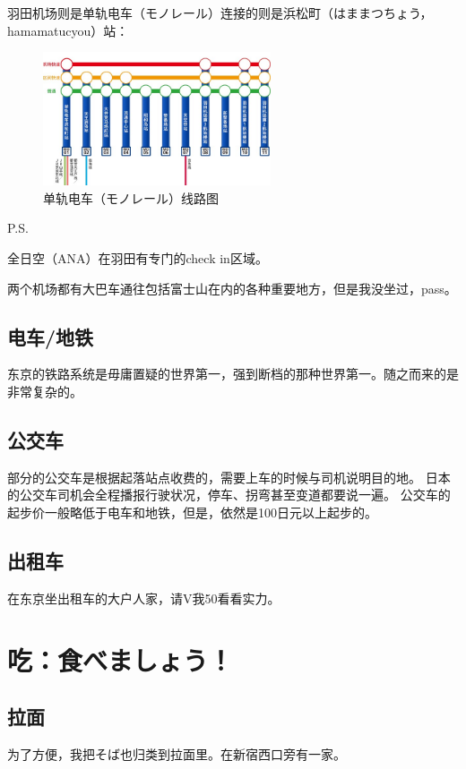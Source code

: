 \documentclass{article}
\begin{document}
羽田机场则是单轨电车（モノレール）连接的则是浜松町（はままつちょう，hamamatucyou）站：
\begin{figure}[h!]
    \centering
    \includegraphics[width=0.6\textwidth]{./fig/routemap_monorail.jpg} %
    \caption{单轨电车（モノレール）线路图\protect\footnotemark}
\end{figure}

P.S.\par
全日空（ANA）在羽田有专门的check in区域。\par
两个机场都有大巴车通往包括富士山在内的各种重要地方，但是我没坐过，pass。

\subsection{电车/地铁}
东京的铁路系统是毋庸置疑的世界第一，强到断档的那种世界第一。随之而来的是非常复杂的。


\subsection{公交车}
部分的公交车是根据起落站点收费的，需要上车的时候与司机说明目的地。
日本的公交车司机会全程播报行驶状况，停车、拐弯甚至变道都要说一遍。
公交车的起步价一般略低于电车和地铁，但是，依然是100日元以上起步的。

\subsection{出租车}
在东京坐出租车的大户人家，请V我50看看实力。

\section{吃：食べましょう！}
\subsection{拉面}
为了方便，我把そば也归类到拉面里。在新宿西口旁有一家\label{res:a}。
\end{document}
